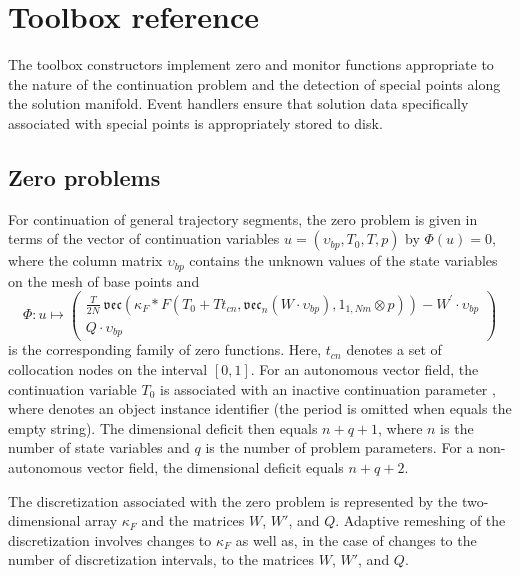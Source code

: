 \section{Toolbox reference}
The toolbox constructors implement zero and monitor functions appropriate to the nature of the continuation problem and the detection of special points along the solution manifold. Event handlers ensure that solution data specifically associated with special points is appropriately stored to disk.

\subsection{Zero problems}
For continuation of general trajectory segments, the zero problem is given in terms of the vector of continuation variables $u=(\upsilon_{bp},T_0,T,p)$ by $\Phi(u)=0$, where the column matrix $\upsilon_{bp}$ contains the unknown values of the state variables on the mesh of base points and
\begin{equation}
\Phi:u\mapsto\begin{pmatrix}
\frac{T}{2N}\ \mathfrak{vec}\left(\kappa_F\ast F\left(T_0+Tt_{cn}, \mathfrak{vec}_{n}\left( W\cdot
\upsilon_{bp}\right) ,1_{1,Nm}\otimes p\right) \right) -W^{\prime }\cdot \upsilon_{bp}\\
Q\cdot \upsilon_{bp}
\end{pmatrix}
\end{equation}
is the corresponding family of zero functions. Here, $t_{cn}$ denotes a set of collocation nodes on the interval $[0,1]$. For an autonomous vector field, the continuation variable $T_0$ is associated with an inactive continuation parameter , where  denotes an object instance identifier (the period is omitted when  equals the empty string). The dimensional deficit then equals $n+q+1$, where $n$ is the number of state variables and $q$ is the number of problem parameters. For a non-autonomous vector field, the dimensional deficit equals $n+q+2$.

The discretization associated with the zero problem is represented by the two-dimensional array $\kappa_F$ and the matrices $W$, $W'$, and $Q$. Adaptive remeshing of the discretization involves changes to $\kappa_F$ as well as, in the case of changes to the number of discretization intervals, to the matrices $W$, $W'$, and $Q$.

